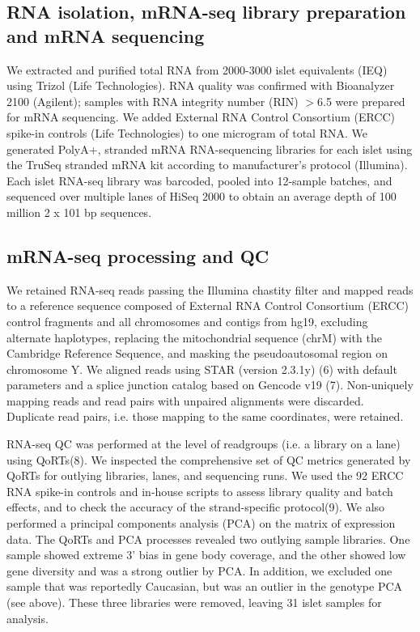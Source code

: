\subsection{RNA isolation, mRNA-seq library preparation and mRNA sequencing} 
We extracted and purified total RNA from 2000-3000 islet equivalents (IEQ) using Trizol (Life Technologies). RNA quality was confirmed with Bioanalyzer 2100 (Agilent); samples with RNA integrity number (RIN) $>$6.5 were prepared for mRNA sequencing. We added External RNA Control Consortium (ERCC) spike-in controls (Life Technologies) to one microgram of total RNA.  We generated PolyA+, stranded mRNA RNA-sequencing libraries for each islet using the TruSeq stranded mRNA kit according to manufacturer’s protocol (Illumina).  Each islet RNA-seq library was barcoded, pooled into 12-sample batches, and sequenced over multiple lanes of HiSeq 2000 to obtain an average depth of 100 million 2 x 101 bp sequences.

\subsection{mRNA-seq processing and QC}
We retained RNA-seq reads passing the Illumina chastity filter and mapped reads to a reference sequence composed of External RNA Control Consortium (ERCC) control fragments and all chromosomes and contigs from hg19, excluding alternate haplotypes, replacing the mitochondrial sequence (chrM) with the Cambridge Reference Sequence, and masking the pseudoautosomal region on chromosome Y. We aligned reads using STAR (version 2.3.1y) (6) with default parameters and a splice junction catalog based on Gencode v19 (7). Non-uniquely mapping reads and read pairs with unpaired alignments were discarded. Duplicate read pairs, i.e. those mapping to the same coordinates, were retained. 

RNA-seq QC was performed at the level of readgroups (i.e. a library on a lane) using QoRTs(8). We inspected the comprehensive set of QC metrics generated by QoRTs for outlying libraries, lanes, and sequencing runs. We used the 92 ERCC RNA spike-in controls and in-house scripts to assess library quality and batch effects, and to check the accuracy of the strand-specific protocol(9). We also performed a principal components analysis (PCA) on the matrix of expression data. The QoRTs and PCA processes revealed two outlying sample libraries.  One sample showed extreme 3’ bias in gene body coverage, and the other showed low gene diversity and was a strong outlier by PCA. In addition, we excluded one sample that was reportedly Caucasian, but was an outlier in the genotype PCA (see above). These three libraries were removed, leaving 31 islet samples for analysis.

